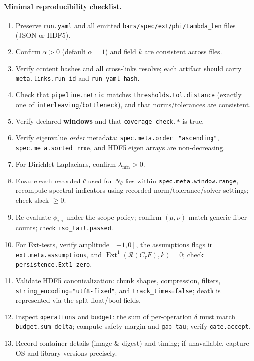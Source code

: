 \documentclass[11pt]{article}
\numberwithin{equation}{section}
\theoremstyle{plain}
\theoremstyle{definition}
\theoremstyle{remark}
\DeclareMathOperator{\Ext}{Ext}
\theoremstyle{plain}
\theoremstyle{definition}
\numberwithin{equation}{section}
\theoremstyle{definition}
\numberwithin{equation}{section}
\theoremstyle{plain}
\theoremstyle{definition}
\theoremstyle{remark}
\begin{document}
\paragraph{Minimal reproducibility checklist.}
\begin{enumerate}[leftmargin=1.25em]
\item Preserve \texttt{run.yaml} and all emitted \texttt{bars/spec/ext/phi/Lambda\_len} files (JSON or HDF5).
\item Confirm \(\alpha>0\) (default \(\alpha=1\)) and field \(k\) are consistent across files.
\item Verify content hashes and all cross-links resolve; each artifact should carry \texttt{meta.links.run\_id}
and \texttt{run\_yaml\_hash}.
\item Check that \texttt{pipeline.metric} matches \texttt{thresholds.tol.distance} (exactly one of
\texttt{interleaving}/\texttt{bottleneck}), and that norms/tolerances are consistent.
\item Verify declared \textbf{windows} and that \texttt{coverage\_check.*} is true.
\item Verify eigenvalue \emph{order} metadata: \texttt{spec.meta.order}=\texttt{"ascending"},
\texttt{spec.meta.sorted}=true, and HDF5 eigen arrays are non-decreasing.
\item For Dirichlet Laplacians, confirm \(\lambda_{\min}>0\).
\item Ensure each recorded \(\theta\) used for \(N_\theta\) lies within \texttt{spec.meta.window.range}; recompute spectral indicators using recorded norm/tolerance/solver settings; check slack \(\ge 0\).
\item Re-evaluate \(\phi_{i,\tau}\) under the scope policy; confirm \((\mu,\nu)\) match generic-fiber counts; check \texttt{iso\_tail.passed}.
\item For Ext-tests, verify amplitude \([-1,0]\), the assumptions flags in \texttt{ext.meta.assumptions},
and \(\Ext^1(\mathcal{R}(C_\tau F),k)=0\); check \texttt{persistence.Ext1\_zero}.
\item Validate HDF5 canonicalization: chunk shapes, compression, filters, \texttt{string\_encoding="utf8-fixed"},
and \texttt{track\_times=false}; death is represented via the split float/bool fields.
\item Inspect \texttt{operations} and \texttt{budget}: the sum of per-operation \(\delta\) must match
\texttt{budget.sum\_delta}; compute safety margin and \texttt{gap\_tau}; verify \texttt{gate.accept}.
\item Record container details (image \& digest) and timing; if unavailable, capture OS and library versions precisely.
\end{enumerate}
\end{document}
